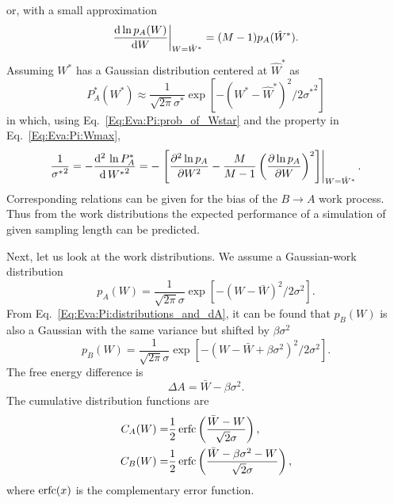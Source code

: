 or, with a small approximation
\begin{equation}
    \frac{\mathop{}\!\mathrm{d} \ln{p_A(W)}}{\mathop{}\!\mathrm{d} W}\biggr\rvert_{W=\hat{W}^\ast}=(M-1)p_A(\hat{W}^\ast).
    \label{Eq:Eva:Pi:Wmax2}
\end{equation}
Assuming $W^\ast$ has a Gaussian distribution centered at $\hat{W}^\ast$ as
\begin{equation}
    P_A^\ast(W^\ast)\approx \frac{1}{\sqrt{2\pi}\sigma^\ast}\exp{\left[-(W^\ast-\hat{W}^\ast)^2/2{\sigma^\ast}^2\right]}
\end{equation}
in which, using Eq.~\ref{Eq:Eva:Pi:prob_of_Wstar} and the property in Eq.~\ref{Eq:Eva:Pi:Wmax},
\begin{equation}
    \frac{1}{{\sigma^\ast}^2}=-\frac{\mathop{}\!\mathrm{d}^2\,\ln{P_A^\ast}}{\mathop{}\!\mathrm{d}\, {W^\ast}^2}=-\left.\left[\frac{\partial^2 \ln{p_A}}{\partial W^2}-\frac{M}{M-1}\left(\frac{\partial \ln p_A}{\partial W}\right)^2\right]\right\rvert_{W=\hat{W}^\ast}.
\end{equation}
Corresponding relations can be given for the bias of the $B\to A$ work process. Thus from the work distributions the expected performance of a simulation of given sampling length can be predicted.

Next, let us look at the work distributions. We assume a Gaussian-work distribution
\begin{equation}
    p_A(W)=\frac{1}{\sqrt{2\pi}\sigma}\exp{\left[-(W-\bar{W})^2/2\sigma^2\right]}.
    \label{Eq:Eva:Pi:pAW}
\end{equation}
From Eq.~\ref{Eq:Eva:Pi:distributions_and_dA}, it can be found that $p_B(W)$ is also a Gaussian with the same variance but shifted by $\beta\sigma^2$
\begin{equation}
    p_B(W)=\frac{1}{\sqrt{2\pi}\sigma}\exp{\left[-(W-\bar{W}+\beta\sigma^2)^2/2\sigma^2\right]}.
\end{equation}
The free energy difference is
\begin{equation}
    \Delta A=\bar{W}-\beta\sigma^2.
    \label{Eq:Eva:Pi:dA}
\end{equation}
The cumulative distribution functions are
\begin{align}
    C_A(W)=&\frac{1}{2} \operatorname{erfc} \left(\frac{\bar{W}-W}{\sqrt{2}\sigma}\right),\\
    C_B(W)=&\frac{1}{2} \operatorname{erfc}\left(\frac{\bar{W}-\beta\sigma^2-W}{\sqrt{2}\sigma}\right),
\end{align}
where $\operatorname{erfc}(x)$ is the complementary error function.

